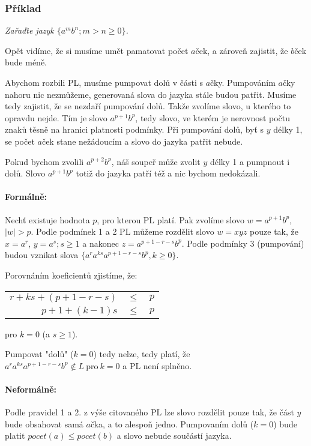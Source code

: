 \documentclass{article}
\begin{document}
\subsubsection{Příklad}

\textit{Zařaďte jazyk $\{a^mb^n; m > n \geq 0\}$.}

Opět vidíme, že si musíme umět pamatovat počet $a$ček, a zároveň zajistit, že $b$ček bude méně.

Abychom rozbili PL, musíme pumpovat dolů v části s $a$čky.
Pumpováním $a$čky nahoru nic nezmůžeme, generovaná slova do jazyka stále budou patřit.
Musíme tedy zajistit, že se nezdaří pumpování dolů.
Takže zvolíme slovo, u kterého to opravdu nejde.
Tím je slovo  $a^{p+1}b^p$, tedy slovo, ve kterém je nerovnost počtu znaků těsně na hranici platnosti podmínky.
Při pumpování dolů, byť s $y$ délky 1, se počet $a$ček stane nežádoucím a slovo do jazyka patřit nebude.

Pokud bychom zvolili $a^{p+2}b^p$, náš soupeř může zvolit $y$ délky 1 a pumpnout i dolů.
Slovo $a^{p+1}b^p$ totiž do jazyka patří též a nic bychom nedokázali.

\paragraph{Formálně:}

Nechť existuje hodnota $p$, pro kterou PL platí.
Pak zvolíme slovo $w = a^{p+1}b^p$, $|w| > p$.
Podle podmínek 1 a 2 PL můžeme rozdělit slovo $w = xyz$ pouze tak, že $x=a^r$, $y = a^s; s \geq 1$ a nakonec $z=a^{p+1-r-s}b^{p}$.
Podle podmínky 3 (pumpování) budou vznikat slova 
$\{a^ra^{ks}a^{p+1-r-s}b^{p}, k\geq 0\}$.

Porovnáním koeficientů zjistíme, že:

\begin{tabular}{rcl}
$r+ks+(p+1-r-s)$  &  $\leq$  &  $p$\\
$p+ 1 + (k-1)s$  &  $\leq$  &  $p$\\
\end{tabular}   pro $k = 0$ (a $s \geq 1$).


Pumpovat "dolů" ($k = 0$) tedy nelze, tedy platí, že $a^ra^{ks}a^{p+1-r-s}b^{p} \notin L \ \text{pro}\ k=0$ a PL není splněno.

\paragraph{Neformálně:}
Podle pravidel 1 a 2. z výše citovaného PL lze slovo rozdělit pouze tak, že část $y$ bude obsahovat samá $a$čka, a to alespoň jedno.
Pumpovaním dolů ($k = 0$) bude platit $pocet(a) \leq pocet(b)$ a slovo nebude součástí jazyka.
\end{document}
